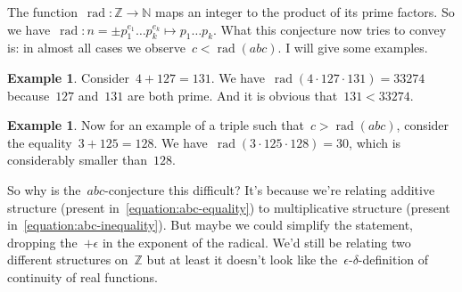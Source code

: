 \documentclass[11pt, a4paper, openany, oneside, article]{memoir}
\theoremstyle{definition}
\newtheorem{example}[theorem]{Example}
\DeclareMathOperator\rad{rad}
\begin{document}
The function~$\rad\colon\mathbb{Z}\to\mathbb{N}$ maps an integer to the product of its prime factors. So we have~$\rad\colon n=\pm p_1^{e_1}\ldots p_k^{e_k}\mapsto p_1\ldots p_k$. What this conjecture now tries to convey is: in almost all cases we observe~$c<\rad(abc)$. I will give some examples.

\begin{example}
  \label{example:abc-1}
  Consider~$4+127=131$. We have~$\rad(4\cdot 127\cdot 131)=33274$ because~$127$ and~$131$ are both prime. And it is obvious that~$131<33274$.
\end{example}

\begin{example}
  \label{example:abc-2}
  Now for an example of a triple such that~$c>\rad(abc)$, consider the equality~$3+125=128$. We have~$\rad(3\cdot 125\cdot 128)=30$, which is considerably smaller than~$128$.
\end{example}

So why is the~$abc$\nobreakdash-conjecture this difficult? It's because we're relating additive structure (present in~\eqref{equation:abc-equality}) to multiplicative structure (present in~\eqref{equation:abc-inequality}). But maybe we could simplify the statement, dropping the~$+\epsilon$ in the exponent of the radical. We'd still be relating two different structures on~$\mathbb{Z}$ but at least it doesn't look like the~$\epsilon$-$\delta$-definition of continuity of real functions.
\end{document}
